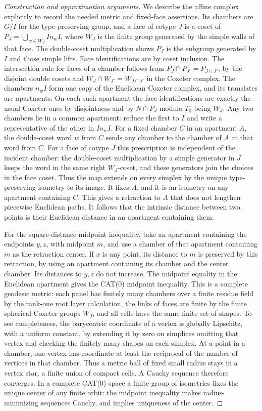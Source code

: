 \documentclass[11pt,a4paper,openany,oneside]{book}
\theoremstyle{resultstyle}
\theoremstyle{definition}
\numberwithin{equation}{chapter}
\begin{document}
\begin{proof}[Construction and approximation arguments]
We describe the affine complex explicitly to record the needed
metric and fixed-face assertions. Its chambers are \(G/I\)
for the type-preserving group, and a face of cotype \(J\) is
a coset of \(P_J=\bigcup_{w\in W_J}I n_w I\), where \(W_J\) is
the finite group generated by the simple walls of that face.
The double-coset multiplication shows \(P_J\) is the subgroup
generated by \(I\) and those simple lifts. Face identifications
are by coset inclusion. The intersection rule for faces
of a chamber follows from \(P_J\cap P_{J'}=P_{J\cap J'}\),
by the disjoint double cosets and
\(W_J\cap W_{J'}=W_{J\cap J'}\) in the Coxeter complex. The chambers \(n_wI\) form one copy
of the Euclidean Coxeter complex, and its translates are
apartments. On each such apartment the face identifications
are exactly the usual Coxeter ones by disjointness and by
\(N\cap P_J\) modulo \(T_0\) being \(W_J\). Any two chambers
lie in a common apartment: reduce the first to \(I\) and
write a representative of the other in \(I n_w I\). For a
fixed chamber \(C\) in an apartment \(A\), the double-coset
word \(w\) from \(C\) sends any chamber to the chamber of \(A\)
at that word from \(C\). For a face of cotype \(J\) this
prescription is independent of the incident chamber: the
double-coset multiplication by a simple generator in \(J\)
keeps the word in the same right \(W_J\)-coset, and these
generators join the choices in the face coset. Thus the map
extends on every simplex by the unique type-preserving
isometry to its image. It fixes \(A\), and it is an isometry
on any apartment containing \(C\). This gives a retraction
to \(A\) that does not lengthen piecewise Euclidean paths.
It follows that the intrinsic distance between two points
is their Euclidean distance in an apartment containing them.

For the square-distance midpoint inequality, take an apartment
containing the endpoints \(y,z\), with midpoint \(m\), and use a
chamber of that apartment containing \(m\) as the retraction
center. If \(x\) is any point, its distance to \(m\) is
preserved by this retraction, by using an apartment containing
its chamber and the center chamber. Its distances to \(y,z\)
do not increase. The midpoint equality in the Euclidean
apartment gives the CAT(0) midpoint inequality. This is a
complete geodesic metric: each panel has finitely many chambers
over a finite residue field by the rank-one root layer
calculation, the links of faces are finite by the finite
spherical Coxeter groups \(W_J\), and all cells have the same
finite set of shapes. To see completeness, the barycentric
coordinate of a vertex is globally Lipschitz, with a uniform
constant, by extending it by zero on simplices omitting that
vertex and checking the finitely many shapes on each simplex.
At a point in a chamber, one vertex has coordinate at least
the reciprocal of the number of vertices in that chamber.
Thus a metric ball of fixed small radius stays in a vertex
star, a finite union of compact cells. A Cauchy sequence
therefore converges. In a complete CAT(0) space a finite
group of isometries fixes the unique center of any finite
orbit: the midpoint inequality makes radius-minimizing
sequences Cauchy, and implies uniqueness of the center.


\end{proof}
\end{document}
